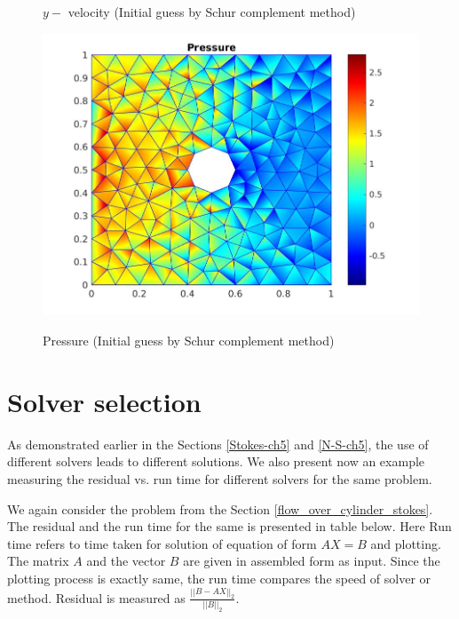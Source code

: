 \documentclass[a4paper]{book}
\begin{document}
\begin{figure}
\begin{minipage}[c]{0.3\textwidth}
    \caption{$y-$ velocity (Initial guess by Schur complement method)}
  \label{y_vel_navier_stoke_schur}
  \end{minipage}
  \begin{minipage}[c]{0.67\textwidth}
    \includegraphics[width=\textwidth]{cylinder_newton_pressure_schur.jpg}
  \end{minipage}\hfill
  \begin{minipage}[c]{0.3\textwidth}
    \caption{Pressure (Initial guess by Schur complement method)}
  \label{pressure_navier_stoke_schur}
  \end{minipage}
\caption{\label{flow_over_cylinder_schur_n_s}}
\end{figure}

\section{Solver selection}

As demonstrated earlier in the Sections \ref{Stokes-ch5} and \ref{N-S-ch5}, the use of different solvers leads to different solutions. We also present now an example measuring the residual vs. run time for different solvers for the same problem.

We again consider the problem from the Section \ref{flow_over_cylinder_stokes}. The residual and the run time for the same is presented in table below.
Here Run time refers to time taken for solution of equation of form $AX = B$ and plotting.  The matrix $A$ and the vector $B$ are given in assembled form as input. Since the plotting process is exactly same, the run time compares the speed of solver or method. Residual is measured as $\frac{||B-AX||_2}{||B||_2}$.
\end{document}
